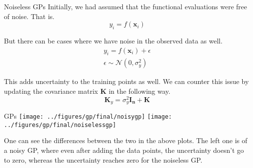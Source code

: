 \documentclass{beamer}
\begin{document}
\begin{frame}{Noiseless GPs}
    Initially, we had assumed that the functional evaluations were free of noise. That is.
	$$y_i = f(\mathbf{x}_i)$$
	
	But there can be cases where we have noise in the observed data as well.
	\begin{gather}
	y_i = f(\mathbf{x}_i) + \epsilon \\
	\epsilon \sim \mathcal{N}(0, \sigma_y^2)
	\end{gather}
	
	This adds uncertainty to the training points as well. We can counter this issue by updating the covariance matrix $\mathbf{K}$ in the following way.
	$$\mathbf{K}_y = \sigma_y^2\mathbf{I_n} + \mathbf{K}$$	
\end{frame}


\begin{frame}{GPs}
	\texttt{[image: ../figures/gp/final/noisygp]}%
	\texttt{[image: ../figures/gp/final/noiselessgp]}
	
	One can see the differences between the two in the above plots. The left one is of a noisy GP, where even after adding the data points, the uncertainty doesn't go to zero, whereas the uncertainty reaches zero for the noiseless GP.
\end{frame}

	
	
\end{document}

